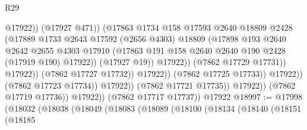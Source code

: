 \begin{lexlean}{R29}
\begin{coremodule}
                                                  @17922))
                                              (@17927 @471))
                                            (@17863
                                              @1734
                                              @158
                                              @17593
                                              @2640
                                              @18809
                                              @2428
                                              (@17889
                                                @1733
                                                @2643
                                                @17592
                                                (@2656 @4303)
                                                @18809
                                                (@17898
                                                  @193
                                                  @2640
                                                  @2642
                                                  @2655
                                                  @4303
                                                  @17910
                                                  (@17863
                                                    @191
                                                    @158
                                                    @2640
                                                    @2640
                                                    @190
                                                    @2428
                                                    (@17919 @190)
                                                    @17922))
                                                (@17927 @19))
                                              @17922))
                                          (@7862 @17729 @17731))
                                        @17922))
                                    (@7862 @17727 @17732))
                                  @17922))
                              (@7862 @17725 @17733))
                            @17922))
                        (@7862 @17723 @17734))
                      @17922))
                  (@7862 @17721 @17735))
                @17922))
            (@7862 @17719 @17736))
          @17922))
      (@7862 @17717 @17737))
    @17922
@18997 := @17998
    (@18032
      (@18038
        (@18049
          (@18083
            (@18089
              (@18100
                (@18134
                  (@18140
                    (@18151
                      (@18185

\end{coremodule}
\end{lexlean}
